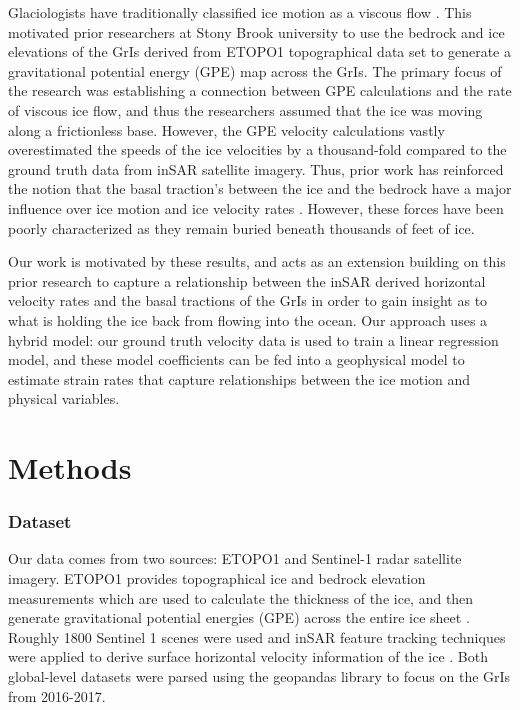 \documentclass{article}
\begin{document}
Glaciologists have traditionally classified ice motion as a viscous flow \cite{morland_steady_1980}. This motivated prior researchers at Stony Brook university to use the bedrock and ice elevations of the GrIs derived from ETOPO1 topographical data set to generate a gravitational potential energy (GPE) map across the GrIs. The primary focus of the research was establishing a connection between GPE calculations and the rate of viscous ice flow, and thus the researchers assumed that the ice was moving along a frictionless base. However, the GPE velocity calculations vastly overestimated the speeds of the ice velocities by a thousand-fold compared to the ground truth data from inSAR satellite imagery. Thus, prior work has reinforced the notion that the basal traction's between the ice and the bedrock have a major influence over ice motion and ice velocity rates \cite{maier_basal_2021}. However, these forces have been poorly characterized as they remain buried beneath thousands of feet of ice.

Our work is motivated by these results, and acts as an extension building on this prior research to capture a relationship between the inSAR derived horizontal velocity rates and the basal tractions of the GrIs in order to gain insight as to what is holding the ice back from flowing into the ocean. Our approach uses a hybrid model: our ground truth velocity data is used to train a linear regression model, and these model coefficients can be fed into a geophysical model to estimate strain rates that capture relationships between the ice motion and physical variables.

\section{Methods}

\subsubsection{Dataset}
Our data comes from two sources: ETOPO1 and Sentinel-1 radar satellite imagery. ETOPO1 provides topographical ice and bedrock elevation measurements which are used to calculate the thickness of the ice, and then generate gravitational potential energies (GPE) across the entire ice sheet \cite{information ETPO1}. Roughly 1800 Sentinel 1 scenes were used and inSAR feature tracking techniques were applied to derive surface horizontal velocity information of the ice \cite{nagler SENTINEL 1}. Both global-level datasets were parsed using the geopandas library to focus on the GrIs from 2016-2017. 
\end{document}
